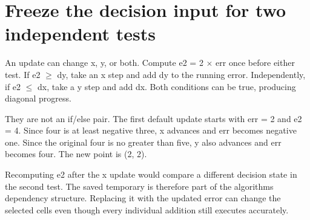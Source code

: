 \section{Freeze the decision input for two independent
  tests}\label{007-bresenham-line-p07-freeze-the-decision-input-for-two-independent-tests}

An update can change x, y, or both. Compute e2 = 2 \ensuremath{\times} err once before
either test. If e2 \ensuremath{\geq} dy, take an x step and add dy to the running error.
Independently, if e2 \ensuremath{\leq} dx, take a y step and add dx. Both conditions can
be true, producing diagonal progress.

They are not an if/else pair. The first default update starts with err =
2 and e2 = 4. Since four is at least negative three, x advances and err
becomes negative one. Since the original four is no greater than five, y
also advances and err becomes four. The new point is (2, 2).

Recomputing e2 after the x update would compare a different decision
state in the second test. The saved temporary is therefore part of the
algorithm\textquotesingle s dependency structure. Replacing it with the
updated error can change the selected cells even though every individual
addition still executes accurately.
